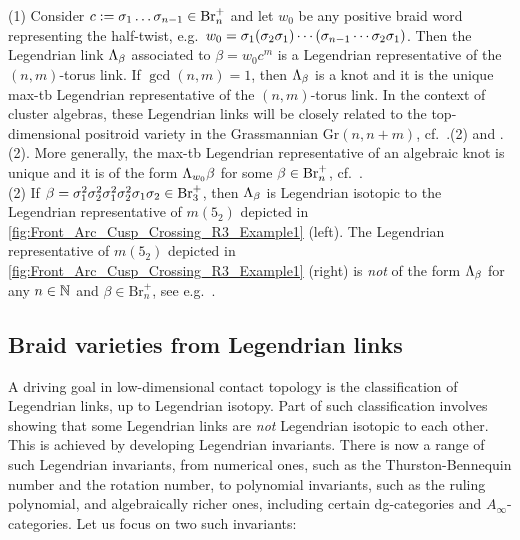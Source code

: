 \begin{example} (1) Consider $c:=\sigma_1\ldots\sigma_{n-1}\in\text{Br}_n^+$ and let $w_0$ be any positive braid word representing the half-twist, e.g.~$w_0=\sigma_1(\sigma_2\sigma_1)\cdots(\sigma_{n-1}\cdots\sigma_2\sigma_1)$. Then the Legendrian link $\Lambda_\beta$ associated to $\beta=w_0c^m$ is a Legendrian representative of the $(n,m)$-torus link. If $\gcd(n,m)=1$, then $\Lambda_\beta$ is a knot and it is the unique max-tb Legendrian representative of the $(n,m)$-torus link. In the context of cluster algebras, these Legendrian links will be closely related to the top-dimensional positroid variety in the Grassmannian $\mbox{Gr}(n,n+m)$, cf.~.(2) and .(2). More generally, the max-tb Legendrian representative of an algebraic knot is unique and it is of the form $\Lambda_{w_0}\beta$ for some $\beta\in\text{Br}_n^+$, cf.~\cite{CasalsLagSkel}.\\

\noindent (2) If $\beta=\sigma_1^2\sigma_2^2\sigma_1^2\sigma_2^2\sigma_1\sigma_2\in\mbox{Br}_3^+$, then $\Lambda_\beta$ is Legendrian isotopic to the Legendrian representative of $m(5_2)$ depicted in \cref{fig:Front_Arc_Cusp_Crossing_R3_Example1} (left). The Legendrian representative of $m(5_2)$ depicted in \cref{fig:Front_Arc_Cusp_Crossing_R3_Example1} (right) is {\it not} of the form $\Lambda_\beta$ for any $n\in\mathbb{N}$ and $\beta\in\mbox{Br}_n^+$, see e.g.~\cite[Section 7.2.2]{STZ2017}.\sbs
\end{example}

\subsection{Braid varieties from Legendrian links}\label{ssec:braid_varieties_Legendrian_links} A driving goal in low-dimensional contact topology is the classification of Legendrian links, up to Legendrian isotopy. Part of such classification involves showing that some Legendrian links are {\it not} Legendrian isotopic to each other. This is achieved by developing Legendrian invariants. There is now a range of such Legendrian invariants, from numerical ones, such as the Thurston-Bennequin number and the rotation number, to polynomial invariants, such as the ruling polynomial, and algebraically richer ones, including certain dg-categories and $A_\infty$-categories. Let us focus on two such invariants:\\

